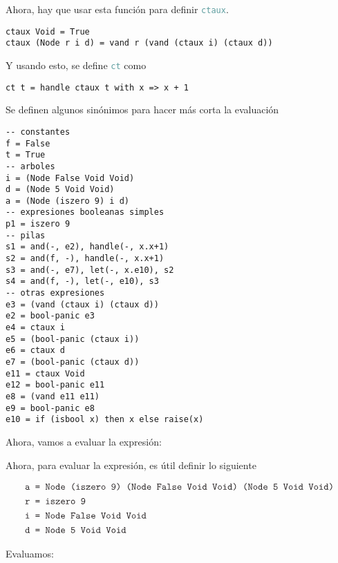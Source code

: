 \documentclass{article}
\newcommand{\tx}[1]{\textcolor{Black} {\texttt{#1}}}
\newcommand{\tp}[1]{\textcolor{CadetBlue} {\texttt{#1}}}
\begin{document}
\begin{enumerate}
        Ahora, hay que usar esta función para definir \tp{ctaux}.

        \begin{verbatim}
ctaux Void = True
ctaux (Node r i d) = vand r (vand (ctaux i) (ctaux d))
        \end{verbatim}

        Y usando esto, se define \tp{ct} como

        \begin{verbatim}
ct t = handle ctaux t with x => x + 1
        \end{verbatim}

        Se definen algunos sinónimos para hacer más corta la evaluación

        \begin{verbatim}
-- constantes
f = False
t = True
-- arboles
i = (Node False Void Void)
d = (Node 5 Void Void)
a = (Node (iszero 9) i d)
-- expresiones booleanas simples
p1 = iszero 9
-- pilas
s1 = and(-, e2), handle(-, x.x+1)
s2 = and(f, -), handle(-, x.x+1)
s3 = and(-, e7), let(-, x.e10), s2
s4 = and(f, -), let(-, e10), s3
-- otras expresiones
e3 = (vand (ctaux i) (ctaux d))
e2 = bool-panic e3
e4 = ctaux i
e5 = (bool-panic (ctaux i))
e6 = ctaux d
e7 = (bool-panic (ctaux d))
e11 = ctaux Void
e12 = bool-panic e11
e8 = (vand e11 e11)
e9 = bool-panic e8
e10 = if (isbool x) then x else raise(x)
        \end{verbatim}

        Ahora, vamos a evaluar la expresión:

		Ahora, para evaluar la expresión, es útil definir lo siguiente
		
		
		\begin{align*}
		&\tx{a = Node (iszero 9) (Node False Void Void) (Node 5 Void Void)} \\
		&\tx{r = iszero 9}\\
		&\tx{i = Node False Void Void}\\
		&\tx{d = Node 5 Void Void}
		\end{align*}

        Evaluamos:
        

\end{enumerate}
\end{document}
